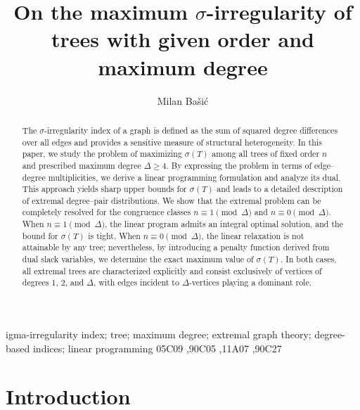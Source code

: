 \documentclass[preprint,12pt]{elsarticle}
\begin{document}
\begin{frontmatter}


\title{On the maximum $\sigma$-irregularity of trees with given order and maximum degree}

\author[address1]{Milan Ba\v si\'c}
\address[address1]{University of Ni\v s, Ni\v s, Serbia}



\begin{abstract}
The $\sigma$-irregularity index of a graph is defined as the sum of squared degree
differences over all edges and provides a sensitive measure of structural
heterogeneity.
In this paper, we study the problem of maximizing $\sigma(T)$ among all trees of
fixed order $n$ and prescribed maximum degree $\Delta\ge4$.
By expressing the problem in terms of edge--degree multiplicities, we derive a
linear programming formulation and analyze its dual.
This approach yields sharp upper bounds for $\sigma(T)$ and leads to a detailed
description of extremal degree--pair distributions.
We show that the extremal problem can be completely resolved for the congruence
classes $n\equiv1\pmod{\Delta}$ and $n\equiv0\pmod{\Delta}$.
When $n\equiv1\pmod{\Delta}$, the linear program admits an integral optimal
solution, and the bound for $\sigma(T)$ is tight.
When $n\equiv0\pmod{\Delta}$, the linear relaxation is not attainable by any
tree; nevertheless, by introducing a penalty function derived from dual slack
variables, we determine the exact maximum value of $\sigma(T)$.
In both cases, all extremal trees are characterized explicitly and consist
exclusively of vertices of degrees $1$, $2$, and $\Delta$, with edges incident to
$\Delta$-vertices playing a dominant role.
\end{abstract}




\begin{keyword}
igma-irregularity index; tree; maximum degree; extremal graph theory; degree-based indices; linear programming
\MSC 05C09 \sep 90C05 \sep 11A07 \sep 	90C27 
\end{keyword}


\end{frontmatter}



\section{Introduction}
\end{document}
